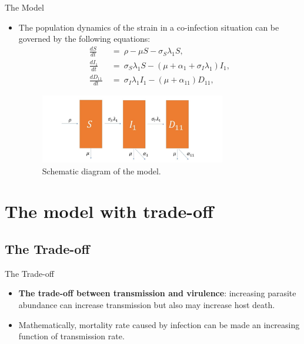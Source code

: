 \documentclass{beamer}
\begin{document}
	\begin{frame}{The Model}
		\begin{itemize}
			\item The population dynamics of the strain in a co-infection situation can be governed by the following equations:
		\begin{align}
			\frac{dS}{dt}\ &=\ \rho -\mu S -\sigma_S\lambda_1S,\\
			\frac{dI_1}{dt}\ &=\ \sigma_S\lambda_1S -(\mu + \alpha_1+\sigma_I\lambda_1)I_1,\\
			\frac{dD_{11}}{dt}\ &=\ \sigma_I\lambda_1I_1 - (\mu+\alpha_{11})D_{11},
		\end{align}
		\begin{figure}[ht]
			\label{Figure 2}
			\begin{center}
				\includegraphics[width=230pt]{model.jpg}
			\end{center}
			\caption{Schematic diagram of the model.}
		\end{figure}
		\end{itemize}
	\end{frame}

	\section{The model with trade-off}
	\subsection{The Trade-off}
	\begin{frame}{The Trade-off}
		\begin{itemize}
			\item \textbf{The trade-off between transmission and virulence}: increasing parasite abundance can increase transmission but also may increase host death. 
			\vspace{1em}
			\item Mathematically, mortality rate caused by infection  can be made an increasing function of transmission rate. 
		\end{itemize}
	\end{frame}
\end{document}
